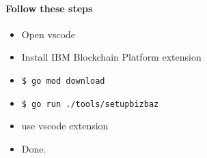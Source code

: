 \paragraph*{Follow these steps}
\begin{itemize}
    \item Open vscode
    \item Install IBM Blockchain Platform extension
    \item \begin{verbatim}$ go mod download\end{verbatim}
    \item \begin{verbatim}$ go run ./tools/setupbizbaz\end{verbatim}
    \item use vscode extension
    \item Done.
\end{itemize}